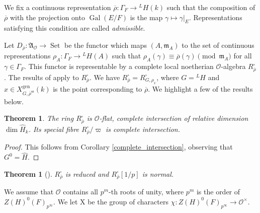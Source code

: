 \documentclass{amsart}
\newtheorem{thm}[prop]{Theorem}
\theoremstyle{definition}
\theoremstyle{remark}
\DeclareMathOperator{\Gal}{Gal}
\DeclareMathOperator{\Set}{Set}
\newcommand{\Aa}{\mathfrak A}
\newcommand{\mm}{\mathfrak m}
\newcommand{\OO}{\mathcal O}
\newcommand{\rhobar}{\overline{\rho}}
\newcommand{\gen}{\mathrm{gen}}
\newcommand{\rhobarss}{\rhobar^{\mathrm{ss}}}
\begin{document}
We fix a continuous representation $\rhobar: \Gamma_F \rightarrow {}^L H(k)$ 
such that the composition of $\rhobar$ with the projection onto $\Gal(E/F)$ 
is the map $\gamma\mapsto \gamma|_E$. Representations satisfying this condition
are called \emph{admissible}. 

Let $D_{\rhobar}: \Aa_{\OO}\rightarrow \Set$ be the functor which maps
$(A, \mm_A)$ to the set of continuous representations $\rho_A:\Gamma_F\rightarrow 
{}^L H(A)$ such that $\rho_A(\gamma)\equiv \rhobar(\gamma)\pmod{\mm_A}$ for all 
$\gamma \in \Gamma_F$. This functor is representable by a complete local 
noetherian $\OO$-algebra $R^{\square}_{\rhobar}$. 
The results of   apply to $R^{\square}_{\rhobar}$.
We have $R^{\square}_{\rhobar}= R^{\square}_{G, \rho_x}$, where 
$G={}^L H$ and $x\in X^{\gen}_{G, \rhobarss}(k)$ is the point corresponding 
to $\rhobar$. We highlight a few of the results below. 




\begin{thm}\label{L1} The ring $R^{\square}_{\rhobar}$ is $\OO$-flat, complete 
intersection of relative dimension $\dim \widehat{H}_k$. Its special 
fibre $R^{\square}_{\rhobar}/\varpi$ is complete intersection.
\end{thm}
\begin{proof} This follows from Corollary \ref{complete_intersection}, observing that $G^0= \widehat{H}$. 
\end{proof}

\begin{thm}[]\label{L1bis} $R^{\square}_{\rhobar}$ is reduced and $R^{\square}_{\rhobar}[1/p]$ is normal.
\end{thm}

We assume that $\OO$ contains all $p^m$-th roots of unity, where $p^m$ is the 
order of $Z(H)^0(F)_{p^{\infty}}$. We let $\mathrm X$ be the group of characters
$\chi: Z(H)^0(F)_{p^{\infty}}\rightarrow \OO^{\times}$. 
\end{document}
